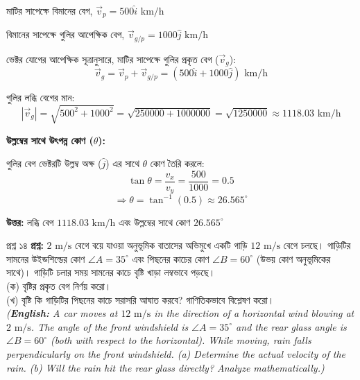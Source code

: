 \documentclass[11pt,a4paper]{article}
\begin{document}
\begin{solbox}
\begin{solbox}
মাটির সাপেক্ষে বিমানের বেগ, $\vec{v}_p = 500\hat{i}\text{ km/h}$

বিমানের সাপেক্ষে গুলির আপেক্ষিক বেগ, $\vec{v}_{g/p} = 1000\hat{j}\text{ km/h}$

ভেক্টর যোগের আপেক্ষিক সূত্রানুসারে, মাটির সাপেক্ষে গুলির প্রকৃত বেগ ($\vec{v}_g$):
$$\vec{v}_g = \vec{v}_p + \vec{v}_{g/p} = (500\hat{i} + 1000\hat{j})\text{ km/h}$$

গুলির লব্ধি বেগের মান:
$$|\vec{v}_g| = \sqrt{500^2 + 1000^2} = \sqrt{250000 + 1000000} = \sqrt{1250000} \approx 1118.03\text{ km/h}$$

\textbf{উল্লম্বের সাথে উৎপন্ন কোণ ($\theta$):}

গুলির বেগ ভেক্টরটি উল্লম্ব অক্ষ ($\hat{j}$) এর সাথে $\theta$ কোণ তৈরি করলে:
$$\tan\theta = \frac{v_x}{v_y} = \frac{500}{1000} = 0.5$$
$$\Rightarrow \theta = \tan^{-1}(0.5) \approx 26.565^\circ$$

\textbf{উত্তর:} লব্ধি বেগ $1118.03\text{ km/h}$ এবং উল্লম্বের সাথে কোণ $26.565^\circ$
\end{solbox}

\vspace{0.4cm}

\begin{qbox}{প্রশ্ন ১৪}
\textbf{প্রশ্ন:} $2\text{ m/s}$ বেগে বয়ে যাওয়া অনুভূমিক বাতাসের অভিমুখে একটি গাড়ি $12\text{ m/s}$ বেগে চলছে। গাড়িটির সামনের উইন্ডশিল্ডের কোণ $\angle A = 35^\circ$ এবং পিছনের কাচের কোণ $\angle B = 60^\circ$ (উভয় কোণ অনুভূমিকের সাথে)। গাড়িটি চলার সময় সামনের কাচে বৃষ্টি খাড়া লম্বভাবে পড়ছে। \\
(ক) বৃষ্টির প্রকৃত বেগ নির্ণয় করো। \\
(খ) বৃষ্টি কি গাড়িটির পিছনের কাচে সরাসরি আঘাত করবে? গাণিতিকভাবে বিশ্লেষণ করো। \\
\textit{(\textbf{English:} A car moves at $12\text{ m/s}$ in the direction of a horizontal wind blowing at $2\text{ m/s}$. The angle of the front windshield is $\angle A = 35^\circ$ and the rear glass angle is $\angle B = 60^\circ$ (both with respect to the horizontal). While moving, rain falls perpendicularly on the front windshield. (a) Determine the actual velocity of the rain. (b) Will the rain hit the rear glass directly? Analyze mathematically.)}
\end{qbox}

\begin{solbox}
\begin{center}
\end{center}
\end{solbox}
\end{solbox}
\end{document}
